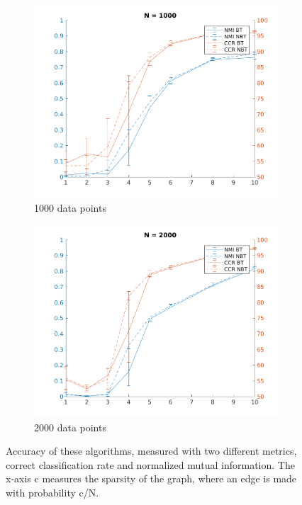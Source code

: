 \documentclass{article}
\begin{document}
\begin{figure}[h]
 
\begin{subfigure}{0.5\textwidth}
\includegraphics[width=.95\linewidth]{N1000variedc} 
\caption{1000 data points}
\label{fig:subim1}
\end{subfigure}
\begin{subfigure}{0.5\textwidth}
\includegraphics[width=.95\linewidth]{N2000variedc}
\caption{2000 data points}
\label{fig:subim2}
\end{subfigure}
\caption{Accuracy of these algorithms, measured with two different metrics, correct classification rate and normalized mutual information. The x-axis c measures the sparsity of the graph, where an edge is made with probability c/N.}
\label{fig:image2}
\end{figure}

\printbibliography
\end{document}
